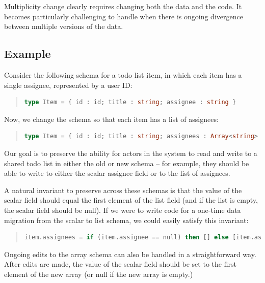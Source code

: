 \documentclass[english,submission]{programming}
\begin{document}
Multiplicity change clearly requires changing both the data and the code. It becomes particularly challenging to handle when there is ongoing divergence between multiple versions of the data.

\subsection{Example}

Consider the following schema for a todo list item, in which each item has a single assignee, represented by a user ID:

\begin{quote}
\begin{lstlisting}[language=ml]
type Item = { id : id; title : string; assignee : string }
\end{lstlisting}
\end{quote}

Now, we change the schema so that each item has a list of assignees:

\begin{quote}
\begin{lstlisting}[language=ml]
type Item = { id : id; title : string; assignees : Array<string> }
\end{lstlisting}
\end{quote}

Our goal is to preserve the ability for actors in the system to read and write to a shared todo list in either the old or new schema -- for example, they should be able to write to either the scalar assignee field or to the list of assignees.

A natural invariant to preserve across these schemas is that the value of the scalar field should equal the first element of the list field (and if the list is empty, the scalar field should be null). If we were to write code for a one-time data migration from the scalar to list schema, we could easily satisfy this invariant:

\begin{quote}
\begin{lstlisting}[language=ml]
item.assignees = if (item.assignee == null) then [] else [item.assignee]
\end{lstlisting}
\end{quote}

Ongoing edits to the array schema can also be handled in a straightforward way. After edits are made, the value of the scalar field should be set to the first element of the new array (or null if the new array is empty.)
\end{document}

